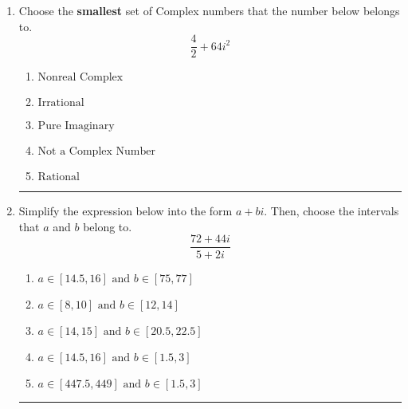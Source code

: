\documentclass[14pt]{extbook}
\newcommand{\litem}[1]{\item#1\hspace*{-1cm}\rule{\textwidth}{0.4pt}}
\begin{document}
\begin{enumerate}
{\begin{enumerate}[label=\Alph*.]
\end{enumerate} }
\litem{
Choose the \textbf{smallest} set of Complex numbers that the number below belongs to.\[ \frac{4}{2}+64i^2 \]\begin{enumerate}[label=\Alph*.]
\item \( \text{Nonreal Complex} \)
\item \( \text{Irrational} \)
\item \( \text{Pure Imaginary} \)
\item \( \text{Not a Complex Number} \)
\item \( \text{Rational} \)

\end{enumerate} }
\litem{
Simplify the expression below into the form $a+bi$. Then, choose the intervals that $a$ and $b$ belong to.\[ \frac{72 + 44 i}{5 + 2 i} \]\begin{enumerate}[label=\Alph*.]
\item \( a \in [14.5, 16] \text{ and } b \in [75, 77] \)
\item \( a \in [8, 10] \text{ and } b \in [12, 14] \)
\item \( a \in [14, 15] \text{ and } b \in [20.5, 22.5] \)
\item \( a \in [14.5, 16] \text{ and } b \in [1.5, 3] \)
\item \( a \in [447.5, 449] \text{ and } b \in [1.5, 3] \)

\end{enumerate} }
\end{enumerate}
\end{document}
